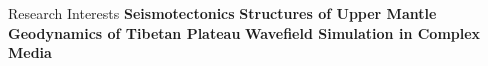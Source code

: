 \begin{rubric}{Research Interests}
\entry*[]
    \textbf{Seismotectonics}
\entry*[] 
    \textbf{Structures of Upper Mantle}
\entry*[]     
    \textbf{Geodynamics of Tibetan Plateau}
\entry*[]     
    \textbf{Wavefield Simulation in Complex Media}
\end{rubric}